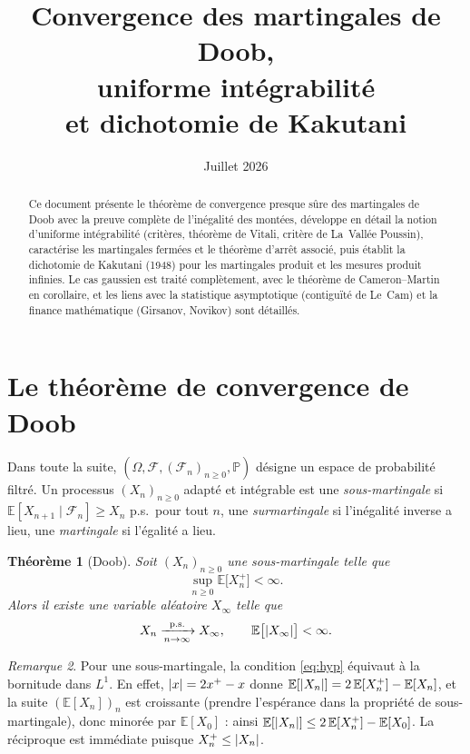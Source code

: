 \documentclass[11pt,a4paper]{article}
\title{Convergence des martingales de Doob,\\
uniforme intégrabilité\\
et dichotomie de Kakutani}
\author{}
\date{Juillet 2026}
\theoremstyle{plain}
\newtheorem{theorem}{Théorème}[section]
\theoremstyle{definition}
\theoremstyle{remark}
\newtheorem{remark}[theorem]{Remarque}
\newcommand{\E}{\mathbb{E}}
\newcommand{\Prob}{\mathbb{P}}
\newcommand{\F}{\mathcal{F}}
\newcommand{\ps}{\text{p.s.}}
\DeclarePairedDelimiter{\abs}{\lvert}{\rvert}
\begin{document}
\maketitle

\begin{abstract}
Ce document présente le théorème de convergence presque sûre des martingales de
Doob avec la preuve complète de l'inégalité des montées, développe en détail la
notion d'uniforme intégrabilité (critères, théorème de Vitali, critère de
La~Vallée Poussin), caractérise les martingales fermées et le théorème d'arrêt
associé, puis établit la dichotomie de Kakutani (1948) pour les martingales
produit et les mesures produit infinies. Le cas gaussien est traité complètement,
avec le théorème de Cameron--Martin en corollaire, et les liens avec la
statistique asymptotique (contiguïté de Le~Cam) et la finance mathématique
(Girsanov, Novikov) sont détaillés.
\end{abstract}

\tableofcontents

\section{Le théorème de convergence de Doob}

Dans toute la suite, $(\Omega, \F, (\F_n)_{n \ge 0}, \Prob)$ désigne un espace de
probabilité filtré. Un processus $(X_n)_{n\ge0}$ adapté et intégrable est une
\emph{sous-martingale} si $\E[X_{n+1} \mid \F_n] \ge X_n$ p.s.\ pour tout $n$,
une \emph{surmartingale} si l'inégalité inverse a lieu, une \emph{martingale} si
l'égalité a lieu.

\begin{theorem}[Doob]\label{thm:doob}
Soit $(X_n)_{n\ge 0}$ une sous-martingale telle que
\begin{equation}\label{eq:hyp}
\sup_{n\ge 0} \E\bigl[X_n^+\bigr] < \infty.
\end{equation}
Alors il existe une variable aléatoire $X_\infty$ telle que
\[
X_n \xrightarrow[n\to\infty]{\ps} X_\infty,
\qquad \E\bigl[\abs{X_\infty}\bigr] < \infty.
\]
\end{theorem}

\begin{remark}\label{rem:L1-equiv}
Pour une sous-martingale, la condition \eqref{eq:hyp} équivaut à la bornitude
dans $L^1$. En effet, $\abs{x} = 2x^+ - x$ donne
$\E[\abs{X_n}] = 2\,\E[X_n^+] - \E[X_n]$, et la suite $(\E[X_n])_n$ est
croissante (prendre l'espérance dans la propriété de sous-martingale), donc
minorée par $\E[X_0]$ : ainsi
$\E[\abs{X_n}] \le 2\,\E[X_n^+] - \E[X_0]$. La réciproque est immédiate puisque
$X_n^+ \le \abs{X_n}$.
\end{remark}
\end{document}
